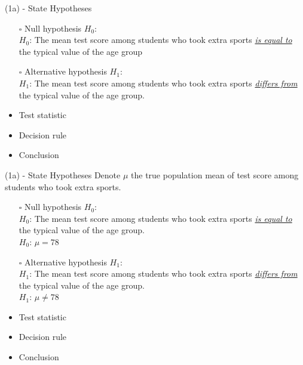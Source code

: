 \documentclass[
  11pt,
  ignorenonframetext,
]{beamer}
\begin{document}
\begin{frame}{(1a) - State Hypotheses}
\protect\hypertarget{a---state-hypotheses}{}
\begin{itemize}
    \item [$\square$] Null hypothesis $H_0$:\\
      $H_0$: The mean test score among students who took extra sports \underline{\textit{is equal to}} the typical value of the age group\\  
    \vspace{2mm}
    \item [$\square$] Alternative hypothesis $H_1$:\\
      $H_1$: The mean test score among students who took extra sports \underline{\textit{differs from}} the typical value of the age group.\\  
    \vspace{2mm}
    \item Test statistic
    \item Decision rule
    \item Conclusion
\end{itemize}
\end{frame}

\begin{frame}{(1a) - State Hypotheses}
\protect\hypertarget{a---state-hypotheses-1}{}
Denote \(\mu\) the true population mean of test score among students who
took extra sports.

\begin{itemize}
    \item [$\square$] Null hypothesis $H_0$:\\
      $H_0$: The mean test score among students who took extra sports \underline{\textit{is equal to}} the typical value of the age group.\\  
      $H_0$: $\mu = 78$
    \vspace{2mm}
    \item [$\square$] Alternative hypothesis $H_1$:\\
      $H_1$: The mean test score among students who took extra sports \underline{\textit{differs from}} the typical value of the age group.\\  
      $H_1$: $\mu \neq 78$\\
    \vspace{2mm}
    \item Test statistic
    \item Decision rule
    \item Conclusion
\end{itemize}
\end{frame}
\end{document}
